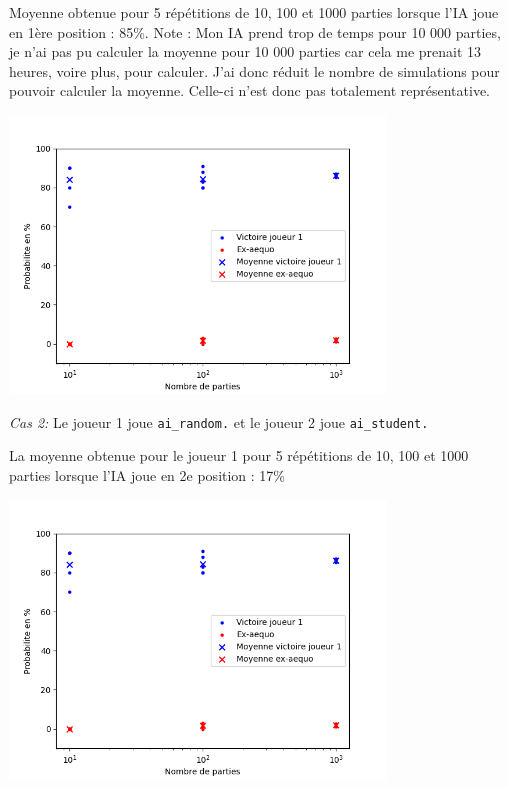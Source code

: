 \documentclass[11pt,answers]{exam}
\begin{document}
\begin{solutionbox}{125mm}
Moyenne obtenue pour 5 répétitions de 10, 100 et 1000 parties lorsque l'IA joue en 1ère position : 85\%.
\newline
Note : Mon IA prend trop de temps pour 10 000 parties, je n'ai pas pu calculer la moyenne pour 10 000 parties car cela me prenait 13 heures, voire plus, pour calculer. J'ai donc réduit le nombre de simulations pour pouvoir calculer la moyenne. Celle-ci n'est donc pas totalement représentative.

\centering
\includegraphics[width=0.75\textwidth]{ai_student_player=1_N=5.png}
\end{solutionbox}

\medskip

\emph{Cas 2:} Le joueur 1 joue \texttt{ai\_random.} et le joueur 2 joue \texttt{ai\_student.}

\begin{solutionbox}{110mm}
La moyenne obtenue pour le joueur 1 pour 5 répétitions de 10, 100 et 1000 parties lorsque l'IA joue en 2e 
position : 17\% 

\centering
\includegraphics[width=0.75\textwidth]{ai_student_player=1_N=5.png}
\end{solutionbox}
\end{document}
